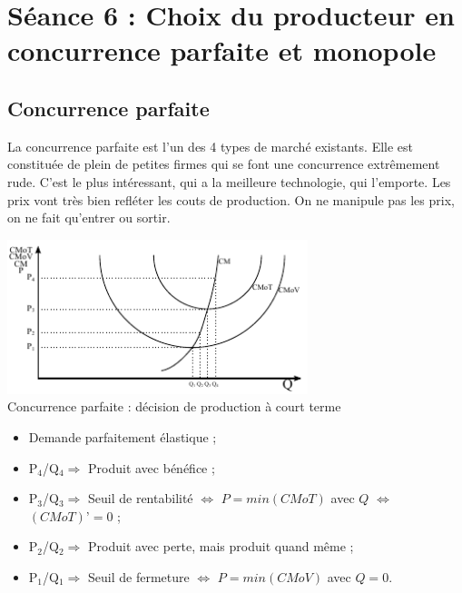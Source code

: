 \section{Séance 6 : Choix du producteur en concurrence parfaite et monopole}


\subsection{Concurrence parfaite}
La concurrence parfaite est l'un des 4 types de marché existants. Elle est constituée de plein de petites firmes qui se font une concurrence extrêmement rude. C'est le plus intéressant, qui a la meilleure technologie, qui l'emporte. Les prix vont très bien refléter les couts de production. On ne manipule pas les prix, on ne fait qu'entrer ou sortir.


\begin{center}
	\includegraphics[height=4.5cm]{images/graph_concurrence_parfaite_court_terme.pdf}\\
	Concurrence parfaite : décision de production à court terme
\end{center}
\begin{itemize}
	\item Demande parfaitement élastique ;
	\item P$_4$/Q$_4 \Rightarrow$ Produit avec bénéfice ;
	\item P$_3$/Q$_3 \Rightarrow$ Seuil de rentabilité $\Leftrightarrow$ $P = min( CMoT )$ avec $Q$ $\Leftrightarrow$ $(CMoT)’ = 0$ ;
	\item P$_2$/Q$_2 \Rightarrow$ Produit avec perte, mais produit quand même ;
	\item P$_1$/Q$_1 \Rightarrow$ Seuil de fermeture $\Leftrightarrow$ $P = min( CMoV )$ avec $Q = 0$.
\end{itemize}

